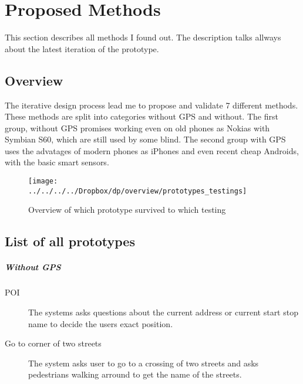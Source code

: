 \chapter{Proposed Methods}
		This section describes all methods I found out. The description talks allways about the latest iteration of the prototype.
		\section{Overview}
		The iterative design process lead me to propose and validate 7 different methods. These methods are split into categories without GPS and without. The first group, without GPS promises working even on old phones as Nokias with Symbian S60, which are still used by some blind. The second group with GPS uses the advatages of modern phones as iPhones and even recent cheap Androids, with the basic smart sensors.
		
		\begin{figure}[ht]
			\centering
			\texttt{[image: ../../../../Dropbox/dp/overview/prototypes\_testings]}
			\caption{Overview of which prototype survived to which testing}
			\label{fig:prototypestestings}
		\end{figure}
		
		\section{List of all prototypes}
		\paragraph{Without GPS}
		\begin{description}
			\item [POI]
			The systems asks questions about the current address or current start stop name to decide the users exact position.
			\item [Go to corner of two streets]
			The system asks user to go to a crossing of two streets and asks pedestrians walking arround to get the name of the streets. 
		\end{description}
